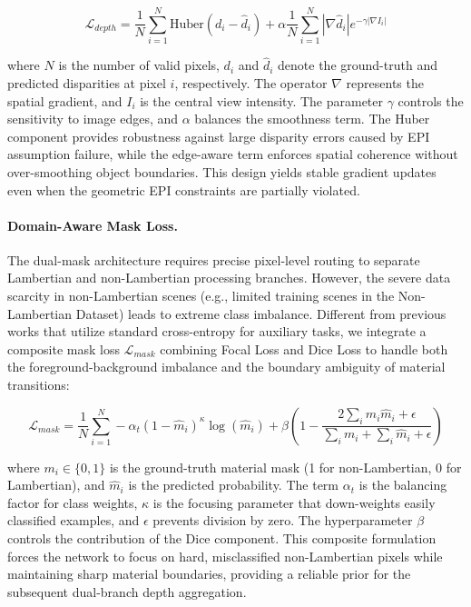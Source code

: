 \begin{equation}
\label{eq:eq25}
\mathcal{L}_{depth} = \frac{1}{N} \sum_{i=1}^{N} \text{Huber}(d_i - \hat{d}_i) + \alpha \frac{1}{N} \sum_{i=1}^{N} |\nabla \hat{d}_i| e^{-\gamma |\nabla I_i|}
\end{equation}

where $N$ is the number of valid pixels, $d_i$ and $\hat{d}_i$ denote the ground-truth and predicted disparities at pixel $i$, respectively. The operator $\nabla$ represents the spatial gradient, and $I_i$ is the central view intensity. The parameter $\gamma$ controls the sensitivity to image edges, and $\alpha$ balances the smoothness term. The Huber component provides robustness against large disparity errors caused by EPI assumption failure, while the edge-aware term enforces spatial coherence without over-smoothing object boundaries. This design yields stable gradient updates even when the geometric EPI constraints are partially violated.

\paragraph{Domain-Aware Mask Loss.}

The dual-mask architecture requires precise pixel-level routing to separate Lambertian and non-Lambertian processing branches. However, the severe data scarcity in non-Lambertian scenes (e.g., limited training scenes in the Non-Lambertian Dataset) leads to extreme class imbalance. Different from previous works that utilize standard cross-entropy for auxiliary tasks, we integrate a composite mask loss $\mathcal{L}_{mask}$ combining Focal Loss and Dice Loss to handle both the foreground-background imbalance and the boundary ambiguity of material transitions:

\begin{equation}
\label{eq:eq26}
\mathcal{L}_{mask} = \frac{1}{N} \sum_{i=1}^{N} - \alpha_t (1 - \hat{m}_i)^{\kappa} \log(\hat{m}_i) + \beta \left( 1 - \frac{2 \sum_{i} m_i \hat{m}_i + \epsilon}{\sum_{i} m_i + \sum_{i} \hat{m}_i + \epsilon} \right)
\end{equation}

where $m_i \in \{0, 1\}$ is the ground-truth material mask (1 for non-Lambertian, 0 for Lambertian), and $\hat{m}_i$ is the predicted probability. The term $\alpha_t$ is the balancing factor for class weights, $\kappa$ is the focusing parameter that down-weights easily classified examples, and $\epsilon$ prevents division by zero. The hyperparameter $\beta$ controls the contribution of the Dice component. This composite formulation forces the network to focus on hard, misclassified non-Lambertian pixels while maintaining sharp material boundaries, providing a reliable prior for the subsequent dual-branch depth aggregation.

